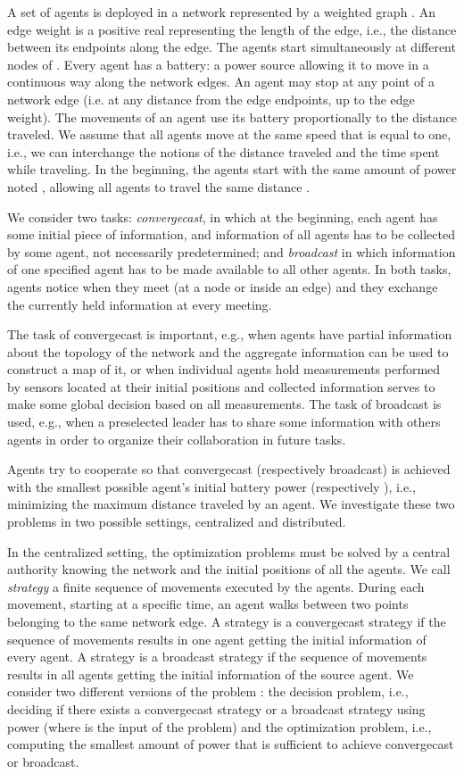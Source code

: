 \documentclass{article}
\newcommand\strat{\mbox{strategy}\xspace}
\newcommand\convergecast{convergecast\xspace}
\newcommand\broadcast{broadcast\xspace}
\begin{document}
A set of agents is deployed in a network represented by a weighted graph . An edge weight is a positive real representing the length of the edge, i.e., the distance between its endpoints along the edge. The agents start simultaneously at different nodes of .  Every agent has a battery: a power source allowing it to move in a continuous way along the network edges. An agent may stop at any point of a network edge (i.e. at any distance from the edge endpoints, up to the edge weight). The movements of an agent use its battery proportionally to the distance traveled. We assume that all agents move at the same speed that is equal to one, i.e., we can interchange the notions of the distance traveled and the time spent while traveling. In the beginning, the agents start with the same amount of power noted , allowing all agents to travel the same distance . 

We consider two tasks: {\em \convergecast}, in which at the beginning, each agent has some initial piece of information, and information of all agents has to be collected by some agent, not necessarily predetermined; and {\em \broadcast} in which information of one specified agent has to be made available to all other agents. In both tasks, agents notice when they meet (at a node or inside an edge) and they exchange the currently held information at every meeting.

 The task of \convergecast is important, e.g., when agents have partial information about the topology of the network and
the aggregate information can be used to construct a map of it, or when individual agents hold measurements
performed by sensors located at their initial positions and collected information serves to make some global decision  based on all measurements. The task of \broadcast is used, e.g., when a preselected leader has to share some information with others agents in order to organize their collaboration in future tasks.

Agents try to cooperate so that {\convergecast} (respectively \broadcast) is achieved with the smallest possible agent's initial battery power  (respectively ), i.e., minimizing the maximum distance traveled by an agent. We investigate these two problems in two possible settings, centralized and distributed. 

In the centralized setting, the optimization problems must be solved by a central authority knowing the network and the initial positions of all the agents. We call \emph{\strat} a finite sequence of movements executed by the agents. During each movement, starting at a specific time, an agent walks between two points belonging to the same network edge. A {\strat} is a {\convergecast} {\strat} if the sequence of movements results in one agent getting the initial information of every agent. 
A {\strat} is a {\broadcast} {\strat} if the sequence of movements results in all agents getting the initial information of the source agent. We consider two different versions of the problem : the decision problem, i.e., deciding if there exists a   {\convergecast} {\strat} or a broadcast \strat using power  (where  is the input of the problem) and the optimization problem, i.e., computing the smallest amount of power that is sufficient to achieve \convergecast or \broadcast. 
\end{document}
